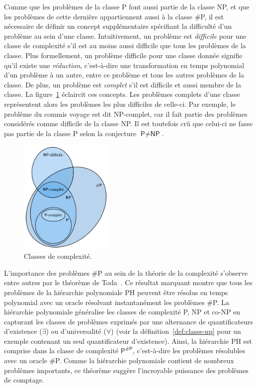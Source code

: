 Comme que les problèmes de la classe \textsf{P} font aussi partie de la classe \textsf{NP}, et que les problèmes de cette dernière appartiennent aussi à la classe \textsf{\#P}, il est nécessaire de définir un concept supplémentaire spécifiant la difficulté d'un problème au sein d'une classe. Intuitivement, un problème est \textit{difficile} pour une classe de complexité s'il est au moins aussi difficile que tous les problèmes de la classe. Plus formellement, un problème difficile pour une classe donnée signifie qu'il existe une \textit{réduction}, c'est-à-dire une transformation en temps polynomial d'un problème à un autre, entre ce problème et tous les autres problèmes de la classe. De plus, un problème est \textit{complet} s'il est difficile et aussi membre de la classe. La figure~\ref{fig:complexity-classes} éclaircit ces concepts. Les problèmes complets d'une classe représentent alors les problèmes les plus difficiles de celle-ci. Par exemple, le problème du commis voyage est dit \textsf{NP}-complet, car il fait partie des problèmes considérés comme difficile de la classe \textsf{NP}. Il est toutefois crû que celui-ci ne fasse pas partie de la classe \textsf{P} selon la conjecture $\textsf{P} \neq \textsf{NP}$.

\begin{figure}[h!]
    \centering
    \includegraphics[width=0.4\textwidth]{figures/complexity-classes.png}
    \caption[Classes de complexité]{Classes de complexité.}
    \label{fig:complexity-classes}
\end{figure}

L'importance des problèmes \textsf{\#P} au sein de la théorie de la complexité s'observe entre autres par le théorème de Toda~\cite{todaPPHardPolynomialTime1991}. Ce résultat marquant montre que tous les problèmes de la hiérarchie polynomiale \textsf{PH} peuvent être résolus en temps polynomial avec un oracle résolvant instantanément les problèmes \textsf{\#P}. La hiérarchie polynomiale généralise les classes de complexité \textsf{P}, \textsf{NP} et \textsf{co-NP} en capturant les classes de problèmes exprimés par une alternance de quantificateurs d'existence ($\exists$) ou d'universalité ($\forall$) (voir la définition~\ref{def:classe-np} pour un exemple contenant un seul quantificateur d'existence). Ainsi, la hiérarchie \textsf{PH} est comprise dans la classe de complexité $\textsf{P}^{\textsf{\#P}}$, c'est-à-dire les problèmes résolubles avec un oracle \textsf{\#P}. Comme la hiérarchie polynomiale contient de nombreux problèmes importants, ce théorème suggère l'incroyable puissance des problèmes de comptage.

